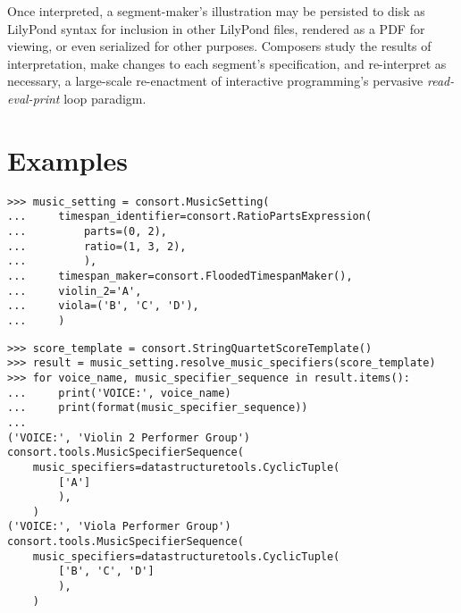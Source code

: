 Once interpreted, a segment-maker's illustration may be persisted to disk as
LilyPond syntax for inclusion in other LilyPond files, rendered as a PDF for
viewing, or even serialized for other purposes. Composers study the results of
interpretation, make changes to each segment's specification, and re-interpret
as necessary, a large-scale re-enactment of interactive programming's pervasive
\emph{read-eval-print} loop paradigm.

\section{Examples}

\begin{comment}
<abjad>
music_setting = consort.MusicSetting(
    timespan_identifier=consort.RatioPartsExpression(
        parts=(0, 2),
        ratio=(1, 3, 2),
        ),
    timespan_maker=consort.FloodedTimespanMaker(),
    violin_2='A',
    viola=('B', 'C', 'D'),
    )
</abjad>
\end{comment}

\begin{singlespacing}
\vspace{-0.5\baselineskip}
\begin{lstlisting}
>>> music_setting = consort.MusicSetting(
...     timespan_identifier=consort.RatioPartsExpression(
...         parts=(0, 2),
...         ratio=(1, 3, 2),
...         ),
...     timespan_maker=consort.FloodedTimespanMaker(),
...     violin_2='A',
...     viola=('B', 'C', 'D'),
...     )
\end{lstlisting}
\end{singlespacing}

\begin{comment}
D<abjad>
score_template = consort.StringQuartetScoreTemplate()
result = music_setting.resolve_music_specifiers(score_template)
for voice_name, music_specifier_sequence in result.items():
    print('VOICE:', voice_name)
    print(format(music_specifier_sequence))

</abjad>
\end{comment}

\begin{singlespacing}
\vspace{-0.5\baselineskip}
\begin{lstlisting}
>>> score_template = consort.StringQuartetScoreTemplate()
>>> result = music_setting.resolve_music_specifiers(score_template)
>>> for voice_name, music_specifier_sequence in result.items():
...     print('VOICE:', voice_name)
...     print(format(music_specifier_sequence))
...
('VOICE:', 'Violin 2 Performer Group')
consort.tools.MusicSpecifierSequence(
    music_specifiers=datastructuretools.CyclicTuple(
        ['A']
        ),
    )
('VOICE:', 'Viola Performer Group')
consort.tools.MusicSpecifierSequence(
    music_specifiers=datastructuretools.CyclicTuple(
        ['B', 'C', 'D']
        ),
    )
\end{lstlisting}
\end{singlespacing}

